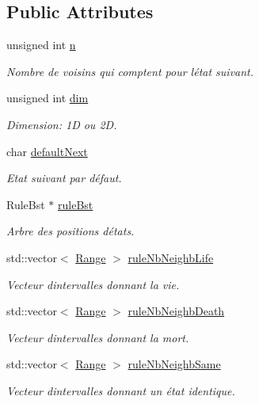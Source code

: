 \subsection*{Public Attributes}
\begin{DoxyCompactItemize}
\item 
unsigned int \mbox{\hyperlink{class_automaton_ac55590f74c2e26e198050887a62ec1cb}{n}}
\begin{DoxyCompactList}\small\item\em Nombre de voisins qui comptent pour l\textquotesingle{}état suivant. \end{DoxyCompactList}\item 
unsigned int \mbox{\hyperlink{class_automaton_a69ea9d67aba5ece34636fb95de1b487f}{dim}}
\begin{DoxyCompactList}\small\item\em Dimension\+: 1D ou 2D. \end{DoxyCompactList}\item 
char \mbox{\hyperlink{class_automaton_aa7894d8b17e4fe17553bca13e5b93cf5}{default\+Next}}
\begin{DoxyCompactList}\small\item\em Etat suivant par défaut. \end{DoxyCompactList}\item 
Rule\+Bst $\ast$ \mbox{\hyperlink{class_automaton_a3b344073044f20fcaba766e34ec24387}{rule\+Bst}}
\begin{DoxyCompactList}\small\item\em Arbre des positions d\textquotesingle{}états. \end{DoxyCompactList}\item 
std\+::vector$<$ \mbox{\hyperlink{struct_automaton_1_1_range}{Range}} $>$ \mbox{\hyperlink{class_automaton_afab3dec429a12d5c1e30c1691ec36c8c}{rule\+Nb\+Neighb\+Life}}
\begin{DoxyCompactList}\small\item\em Vecteur d\textquotesingle{}intervalles donnant la vie. \end{DoxyCompactList}\item 
std\+::vector$<$ \mbox{\hyperlink{struct_automaton_1_1_range}{Range}} $>$ \mbox{\hyperlink{class_automaton_a3c4b049f935fe17aa3fc7e40c7fa8f7f}{rule\+Nb\+Neighb\+Death}}
\begin{DoxyCompactList}\small\item\em Vecteur d\textquotesingle{}intervalles donnant la mort. \end{DoxyCompactList}\item 
std\+::vector$<$ \mbox{\hyperlink{struct_automaton_1_1_range}{Range}} $>$ \mbox{\hyperlink{class_automaton_a7a9a78c542bfdc9cb9c01ad268ae1485}{rule\+Nb\+Neighb\+Same}}
\begin{DoxyCompactList}\small\item\em Vecteur d\textquotesingle{}intervalles donnant un état identique. \end{DoxyCompactList}\end{DoxyCompactItemize}
